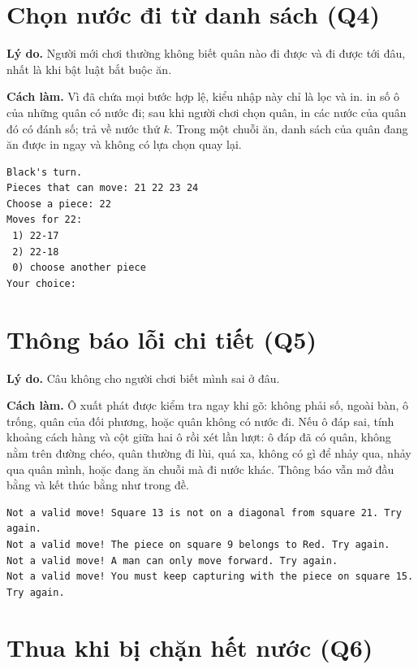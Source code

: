 \section{Chọn nước đi từ danh sách (Q4)}

\textbf{Lý do.} Người mới chơi thường không biết quân nào đi được và đi được tới đâu, nhất là khi bật luật bắt buộc ăn.

\textbf{Cách làm.} Vì  đã chứa mọi bước hợp lệ, kiểu nhập này chỉ là lọc và in.  in số ô của những quân có nước đi; sau khi người chơi chọn quân,  in các nước của quân đó có đánh số;  trả về nước thứ $k$. Trong một chuỗi ăn, danh sách của quân đang ăn được in ngay và không có lựa chọn quay lại.

\begin{lstlisting}[style=screen,caption={Nhập nước đi bằng cách chọn từ danh sách}]
Black's turn.
Pieces that can move: 21 22 23 24
Choose a piece: 22
Moves for 22:
 1) 22-17
 2) 22-18
 0) choose another piece
Your choice:
\end{lstlisting}

\section{Thông báo lỗi chi tiết (Q5)}

\textbf{Lý do.} Câu  không cho người chơi biết mình sai ở đâu.

\textbf{Cách làm.} Ô xuất phát được kiểm tra ngay khi gõ: không phải số, ngoài bàn, ô trống, quân của đối phương, hoặc quân không có nước đi. Nếu ô đáp sai,  tính khoảng cách hàng và cột giữa hai ô rồi xét lần lượt: ô đáp đã có quân, không nằm trên đường chéo, quân thường đi lùi, quá xa, không có gì để nhảy qua, nhảy qua quân mình, hoặc đang ăn chuỗi mà đi nước khác. Thông báo vẫn mở đầu bằng  và kết thúc bằng  như trong đề.

\begin{lstlisting}[style=screen,caption={Một số thông báo lỗi}]
Not a valid move! Square 13 is not on a diagonal from square 21. Try again.
Not a valid move! The piece on square 9 belongs to Red. Try again.
Not a valid move! A man can only move forward. Try again.
Not a valid move! You must keep capturing with the piece on square 15. Try again.
\end{lstlisting}

\section{Thua khi bị chặn hết nước (Q6)}

